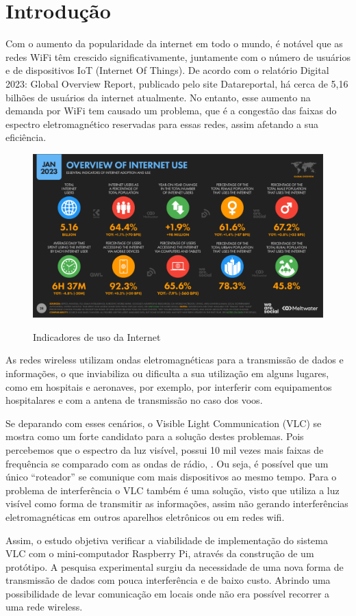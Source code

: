 \chapter{Introdução}

Com o aumento da popularidade da internet em todo o mundo, é notável que as redes WiFi têm crescido significativamente, juntamente com o número de usuários e de dispositivos IoT (Internet Of Things). De acordo com o relatório Digital 2023: Global Overview Report, publicado pelo site Datareportal, há cerca de 5,16 bilhões de usuários da internet atualmente. No entanto, esse aumento na demanda por WiFi tem causado um problema, que é a congestão das faixas do espectro eletromagnético reservadas para essas redes, assim afetando a sua eficiência.

\begin{figure}[htb]
  \centering
  \caption{Indicadores de uso da Internet}
  \includegraphics[scale=0.45]{images/internet_use.png}
  \label{figura:usoInternet}
\end{figure}

As redes  wireless utilizam ondas eletromagnéticas para a transmissão de dados e informações, o que inviabiliza ou dificulta a sua utilização em alguns lugares, como em hospitais e aeronaves, por exemplo, por interferir com equipamentos hospitalares e com a antena de transmissão no caso dos voos.

Se deparando com esses cenários, o Visible Light Communication (VLC) se mostra como um forte candidato para a solução destes problemas. Pois percebemos que o espectro da luz visível, possui 10 mil vezes mais faixas de frequência se comparado com as ondas de rádio, . Ou seja, é possível que um único “roteador” se comunique com mais dispositivos ao mesmo tempo.
Para o problema de interferência o VLC também é uma solução, visto que utiliza a luz visível como forma de transmitir as informações, assim não gerando interferências eletromagnéticas em outros aparelhos eletrônicos ou em redes wifi.

Assim, o estudo objetiva verificar a viabilidade de implementação do sistema VLC com o mini-computador Raspberry Pi, através da construção de um protótipo. A pesquisa experimental surgiu da necessidade de uma nova forma de transmissão de dados com pouca interferência e de baixo custo. Abrindo uma  possibilidade de levar comunicação em locais onde não era possível recorrer a uma rede wireless.

